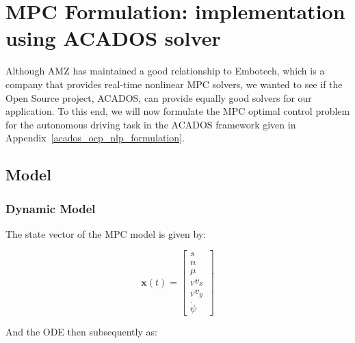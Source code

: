 \documentclass[
a4paper, %
10pt, %
notitlepage,
english]{CSUniSchoolLabReport}
\begin{document}
\chapter{MPC Formulation: implementation using ACADOS solver}

Although AMZ has maintained a good relationship to Embotech, which is a company that provides real-time nonlinear MPC solvers, we wanted to see if the Open Source project, ACADOS, can provide equally good solvers for our application. To this end, we will now formulate the MPC optimal control problem for the autonomous driving task in the ACADOS framework given in Appendix~\ref{acados_ocp_nlp_formulation}.

\section{Model}

\subsection{Dynamic Model}

The state vector of the MPC model is given by:

\begin{equation}
	\mathbf{x}(t) = 
	\left[\begin{array}{c}
		
		s \\ 
		
		n \\ 
		
		\mu \\
		
		{}_Vv_x \\
		
		{}_Vv_y \\
		
		\dot{\psi}\;\;\;
		
	\end{array}\right]
\end{equation}

And the ODE then subsequently as:
\end{document}
